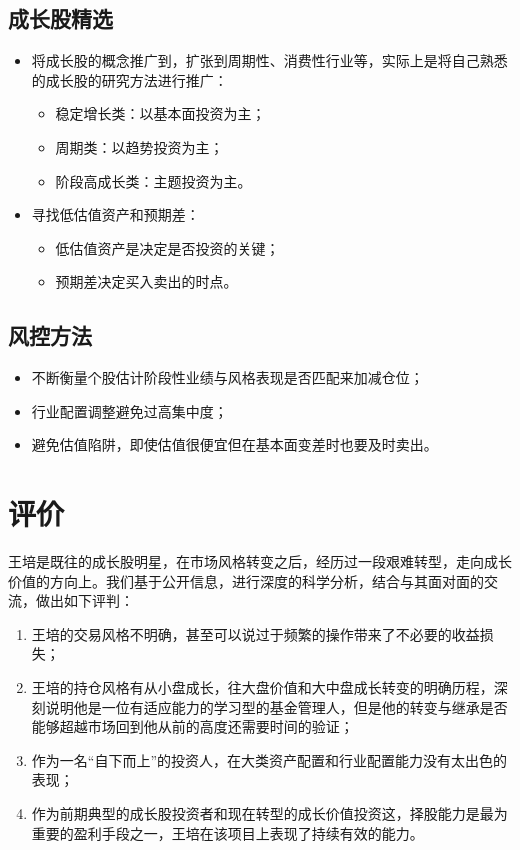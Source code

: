 \documentclass[journal=jacsat,manuscript=article]{achemso}
\providecommand{\tightlist}{%
  \setlength{\itemsep}{0pt}\setlength{\parskip}{0pt}}
\begin{document}
\subsection{成长股精选}

\begin{itemize}
\item 将成长股的概念推广到，扩张到周期性、消费性行业等，实际上是将自己熟悉的成长股的研究方法进行推广：
\begin{itemize}
  \item 稳定增长类：以基本面投资为主；
  \item 周期类：以趋势投资为主；
  \item 阶段高成长类：主题投资为主。
  \end{itemize}
\item 寻找低估值资产和预期差：
\begin{itemize}
  \item 低估值资产是决定是否投资的关键；
  \item 预期差决定买入卖出的时点。
\end{itemize}

\end{itemize}

\subsection{风控方法}

\begin{itemize}
\item 不断衡量个股估计阶段性业绩与风格表现是否匹配来加减仓位；
\item 行业配置调整避免过高集中度；
\item 避免估值陷阱，即使估值很便宜但在基本面变差时也要及时卖出。
\end{itemize}

\section{评价}

王培是既往的成长股明星，在市场风格转变之后，经历过一段艰难转型，走向成长价值的方向上。我们基于公开信息，进行深度的科学分析，结合与其面对面的交流，做出如下评判：

\begin{enumerate}
\def\labelenumi{\arabic{enumi}.}
\tightlist
\item
  王培的交易风格不明确，甚至可以说过于频繁的操作带来了不必要的收益损失；
\item
  王培的持仓风格有从小盘成长，往大盘价值和大中盘成长转变的明确历程，深刻说明他是一位有适应能力的学习型的基金管理人，但是他的转变与继承是否能够超越市场回到他从前的高度还需要时间的验证；
\item
  作为一名``自下而上''的投资人，在大类资产配置和行业配置能力没有太出色的表现；
\item
  作为前期典型的成长股投资者和现在转型的成长价值投资这，择股能力是最为重要的盈利手段之一，王培在该项目上表现了持续有效的能力。
\end{enumerate}
\end{document}
